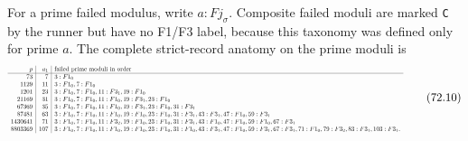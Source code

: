 \documentclass[10pt,reqno]{amsart}
\theoremstyle{definition}
\newcommand{\1}{\mathbf 1}
\begin{document}
For a prime failed modulus, write $a:Fj_\sigma$.  Composite failed moduli
are marked \texttt{C} by the runner but have no F1/F3 label, because this taxonomy
was defined only for prime $a$.  The complete strict-record anatomy on the
prime moduli is
\begin{equation}
\resizebox{\textwidth}{!}{$
\begin{array}{r|r|l}
p&a_1&\hbox{failed prime moduli in order}\\ \hline
73&7&3:F1_0\\
1129&11&3:F1_0,7:F1_0\\
1201&23&3:F1_0,7:F1_0,11:F3_1,19:F1_0\\
21169&31&3:F1_0,7:F1_0,11:F1_0,19:F3_1,23:F1_0\\
67369&35&3:F1_0,7:F1_0,11:F1_0,19:F3_1,23:F1_0,31:F3_1\\
87481&63&3:F1_0,7:F1_0,11:F1_0,19:F1_0,23:F1_0,31:F3_1,43:F3_1,47:F1_0,59:F3_1\\
1430641&71&3:F1_0,7:F1_0,11:F3_2,19:F1_0,23:F1_0,31:F3_1,43:F1_0,47:F1_0,59:F1_0,67:F3_1\\
8803369&107&3:F1_0,7:F1_0,11:F1_0,19:F1_0,23:F1_0,31:F1_0,43:F3_1,47:F1_0,59:F3_1,67:F3_1,71:F1_0,79:F3_2,83:F3_1,103:F3_1.
\end{array}
$}                                                          \tag{72.10}
\end{equation}
\end{document}
